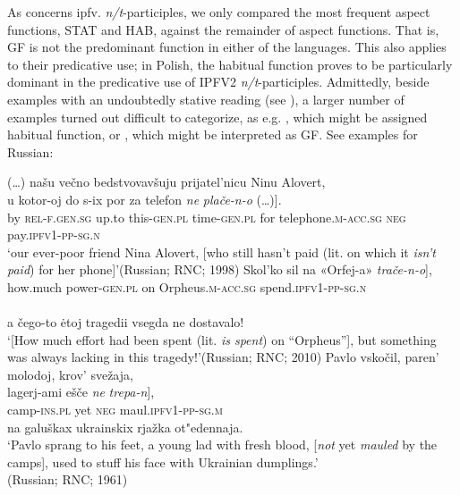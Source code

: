 \documentclass[output=paper]{langscibook}
\begin{document}
As concerns ipfv. \textit{n/t}-participles, we only compared the most frequent aspect functions, STAT and HAB, against the remainder of aspect functions. That is, GF is not the predominant function in either of the languages. This also applies to their predicative use; in Polish, the habitual function proves to be particularly dominant in the predicative use of IPFV2 \textit{n/t}-participles. Admittedly, beside examples with an undoubtedly stative reading (see ), a larger number of examples turned out difficult to categorize, as e.g. , which might be assigned habitual function, or , which might be interpreted as GF. See examples for Russian:\largerpage[-2]

\ea\label{wiem:ex:isntpaid}{{(\dots) našu večno bedstvovavšuju prijatel’nicu Ninu Alovert,}\\
\gll \minsp{[} {u} {kotor-oj} {do} {s-ix} {por} {za} {telefon} {\textit{ne}} {\textit{plače-n-o} (\dots)]}.\\
{} by \textsc{rel}-\textsc{f.gen.sg} up.to this-\textsc{gen.pl} time-\textsc{gen.pl} for telephone.\textsc{m-acc.sg} \textsc{neg} pay.\textsc{ipfv1-pp-sg.n}\\
\glt ‘our ever-poor friend Nina Alovert, [who still hasn’t paid (lit. on which it \textit{isn’t paid}) for her phone]’\hfill (Russian; RNC; 1998)
}
\ex\label{wiem:ex:isspent}{\gll
\minsp{[} {Skol’ko} {sil} {na} {«Orfej-a»} {\textit{trače-n-o}}],\\
{} how.much power-\textsc{gen.pl} on Orpheus.\textsc{m-acc.sg} spend.\textsc{ipfv1-pp-sg.n}\\
{\\a čego-to ėtoj tragedii vsegda ne dostavalo!}\\
\glt ‘[How much effort had been spent (lit. \textit{is spent}) on “Orpheus”], but something was always lacking in this tragedy!’\hfill (Russian; RNC; 2010)
}
\ex\label{wiem:ex:notmauled}{{Pavlo vskočil, paren’ molodoj, krov’ svežaja,}\\
\gll \minsp{[} {lagerj-ami} {ešče} {\textit{ne}} {\textit{trepa-n}]},\\
{} camp-\textsc{ins.pl} yet \textsc{neg} maul.\textsc{ipfv1-pp-sg.m}\\
{na galuškax ukrainskix rjažka ot"edennaja.}\\
\glt‘Pavlo sprang to his feet, a young lad with fresh blood, [\textit{not} yet \textit{mauled} by the camps], used to stuff his face with Ukrainian dumplings.’ \\ 
\hfill (Russian; RNC; 1961)
}
\z
\end{document}
